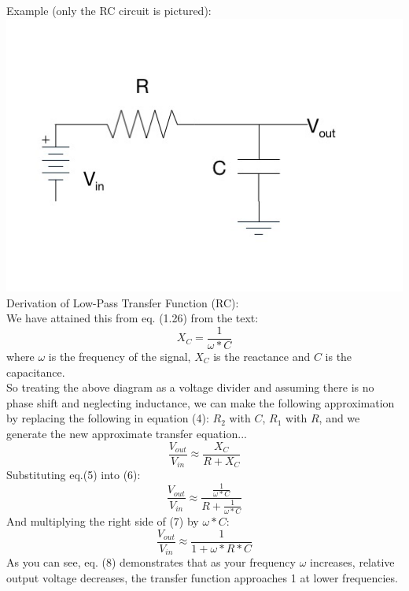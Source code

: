 \documentclass{article}
\begin{document}
\begin{enumerate}
\begin{enumerate}
        Example (only the RC circuit is pictured):\\
        \includegraphics[scale=0.5]{lowpassFilter.jpg} \\
        Derivation of Low-Pass Transfer Function (RC): \\
        We have attained this from eq. (1.26) from the text: \\
        \begin{equation}
            X_C = \frac{1}{\omega*C}
        \end{equation}
        where $\omega$ is the frequency of the signal, $X_C$ is the reactance and $C$ is the capacitance.\\
        So treating the above diagram as a voltage divider and assuming there is no phase shift and neglecting inductance, we can make the following approximation by replacing the following in equation (4): $R_2$ with $C$, $R_1$ with $R$, and we generate the new approximate transfer equation...
        \begin{equation}
            \frac{V_{out}}{V_{in}} \approx \frac{X_C}{R + X_C}
        \end{equation}
        Substituting eq.(5) into (6): \\
        \begin{equation}
            \frac{V_{out}}{V_{in}} \approx \frac{\frac{1}{\omega*C}}{R+\frac{1}{\omega*C}}
        \end{equation}
        And multiplying the right side of (7) by $\omega*C$: \\
        \begin{equation}
            \frac{V_{out}}{V_{in}} \approx \frac{1}{1+\omega*R*C}
        \end{equation}
        As you can see, eq. (8) demonstrates that as your frequency $\omega$ increases, relative output voltage decreases, the transfer function approaches 1 at lower frequencies.
        

\end{enumerate}
\end{enumerate}
\end{document}
